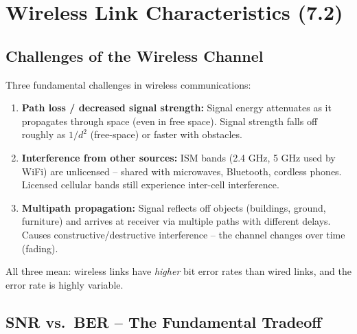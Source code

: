 \section{Wireless Link Characteristics (7.2)}

\subsection{Challenges of the Wireless Channel}

\begin{warnbox}
Three fundamental challenges in wireless communications:
\begin{enumerate}[noitemsep]
    \item \textbf{Path loss / decreased signal strength:} Signal energy attenuates as it propagates through space (even in free space). Signal strength falls off roughly as $1/d^2$ (free-space) or faster with obstacles.
    \item \textbf{Interference from other sources:} ISM bands (2.4 GHz, 5 GHz used by WiFi) are unlicensed -- shared with microwaves, Bluetooth, cordless phones. Licensed cellular bands still experience inter-cell interference.
    \item \textbf{Multipath propagation:} Signal reflects off objects (buildings, ground, furniture) and arrives at receiver via multiple paths with different delays. Causes constructive/destructive interference -- the channel changes over time (fading).
\end{enumerate}
All three mean: wireless links have \emph{higher} bit error rates than wired links, and the error rate is highly variable.
\end{warnbox}

\subsection{SNR vs.\ BER -- The Fundamental Tradeoff}

